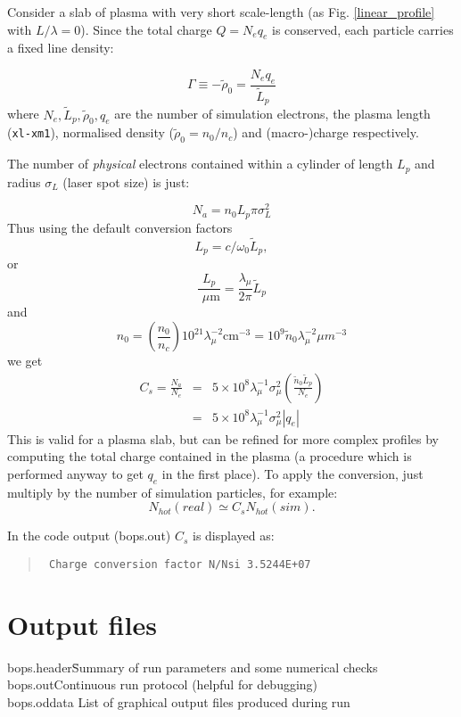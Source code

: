 \documentclass[11pt]{article}
\def\bea{\begin{eqnarray}}
\def\eea{\end{eqnarray}}
\newcommand{\mum}{~$\mu$m}
\begin{document}
Consider a slab of plasma with very short scale-length (as Fig. \ref{linear_profile} with $L/\lambda=0$).  Since the total charge $Q=N_eq_e$ is conserved, each particle carries a fixed line density:

$$
\Gamma \equiv -\tilde{\rho}_0 = \frac{N_eq_e}{\tilde{L}_p}
$$
where $N_e, \tilde{L}_p, \tilde{\rho}_0, q_e$ are the number of simulation electrons, the plasma length (\texttt{xl-xm1}), normalised density ($\tilde{\rho}_0=n_0/n_c$) and (macro-)charge respectively.  

The number of \emph{physical} electrons contained within a cylinder of length $L_p$ and radius $\sigma_L$ (laser spot size) is just:

$$
N_a = n_0L_p\pi\sigma_L^2
$$
Thus using the default conversion factors
$$L_p = c/\omega_0\tilde{L}_p,$$
 or 
$$\frac{L_p}{\mbox{\mum}} = \frac{\lambda_{\mu}}{2\pi}\tilde{L}_p  
$$
and 
$$
n_0 = \left(\frac{n_0}{n_c}\right)10^{21}\lambda_{\mu}^{-2}\mbox{cm}^{-3} = 10^9\tilde{n}_0\lambda_{\mu}^{-2}\mu m^{-3}$$
we get
\bea
C_s = \frac{N_a}{N_e} &=& 5\times 10^8\lambda_{\mu}^{-1}\sigma_{\mu}^{2}\left(\frac{\tilde{n}_0\tilde{L}_p}{N_e} \right)\nonumber \\
&=& 5\times 10^8\lambda_{\mu}^{-1}\sigma_{\mu}^{2}|q_e|
\eea
This is valid for a plasma slab, but can be refined for more complex profiles by computing the total charge contained in the plasma (a procedure which is performed anyway to get $q_e$ in the first place).
To apply the conversion, just multiply by the number of simulation particles, for example: $$N_{hot}(real) \simeq C_s N_{hot}(sim).$$  

\noindent In the code output (bops.out) $C_s$ is displayed as:
\begin{quote}
\texttt{
Charge conversion factor N/Nsi   3.5244E+07
}
\end{quote}

\section{Output files} 

\begin{tabbing}
 bops.header\hspace{1cm}\=Summary of run parameters and some numerical checks \\
 bops.out\>Continuous run protocol (helpful for debugging)\\ 
 bops.oddata\> List of graphical output files produced during run 
\end{tabbing}
\end{document}
